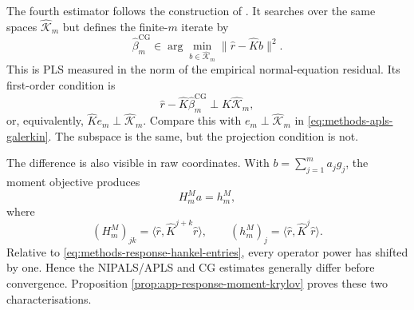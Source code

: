 The fourth estimator follows the construction of
\textcite{babii_carrasco_tsafack_2026}.  It searches over the same spaces
$\widehat{\mathcal K}_m$ but defines the finite-$m$ iterate by
\begin{equation}
    \widehat\beta_m^{\mathrm{CG}}
    \in\arg\min_{b\in\widehat{\mathcal K}_m}
      \|\widehat r-\widehat Kb\|^2.
    \label{eq:methods-cg-moment-objective}
\end{equation}
This is PLS measured in the norm of the empirical normal-equation residual.
Its first-order condition is
\begin{equation}
    \widehat r-\widehat K\widehat\beta_m^{\mathrm{CG}}
    \perp\widehat K\widehat{\mathcal K}_m,
    \label{eq:methods-cg-projection-condition}
\end{equation}
or, equivalently, $\widehat K e_m\perp\widehat{\mathcal K}_m$.  Compare this
with $e_m\perp\widehat{\mathcal K}_m$ in
\eqref{eq:methods-apls-galerkin}.  The subspace is the same, but the
projection condition is not.

The difference is also visible in raw coordinates.  With
$b=\sum_{j=1}^{m}a_jg_j$, the moment objective produces
\begin{equation}
    H_m^{M}a=h_m^{M},
    \label{eq:methods-moment-hankel-system}
\end{equation}
where
\begin{equation}
    (H_m^{M})_{jk}
    =\langle\widehat r,
      \widehat K^{j+k}\widehat r\rangle,
    \qquad
    (h_m^{M})_j
    =\langle\widehat r,
      \widehat K^{j}\widehat r\rangle.
    \label{eq:methods-moment-hankel-entries}
\end{equation}
Relative to \eqref{eq:methods-response-hankel-entries}, every operator power
has shifted by one.  Hence the NIPALS/APLS and CG estimates
generally differ before convergence.  Proposition
\ref{prop:app-response-moment-krylov} proves these two characterisations.

